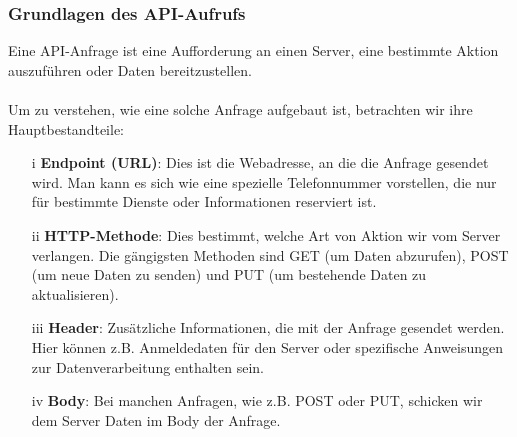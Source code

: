 \documentclass[12pt,a4paper]{article}
\begin{document}
\subsubsection{Grundlagen des API-Aufrufs}
Eine API-Anfrage ist eine Aufforderung an einen Server, eine bestimmte Aktion auszuführen oder Daten bereitzustellen. 
\\ \\
Um zu verstehen, wie eine solche Anfrage aufgebaut ist, betrachten wir ihre Hauptbestandteile:
\begin{enumerate}
	\item[i] \textbf{Endpoint (URL)}: Dies ist die Webadresse, an die die Anfrage gesendet wird. Man kann es sich wie eine spezielle Telefonnummer vorstellen, die nur für bestimmte Dienste oder Informationen reserviert ist.
	\item[ii] \textbf{HTTP-Methode}: Dies bestimmt, welche Art von Aktion wir vom Server verlangen. Die gängigsten Methoden sind GET (um Daten abzurufen), POST (um neue Daten zu senden) und PUT (um bestehende Daten zu aktualisieren).
	\item[iii]  \textbf{Header}: Zusätzliche Informationen, die mit der Anfrage gesendet werden. Hier können z.B. Anmeldedaten für den Server oder spezifische Anweisungen zur Datenverarbeitung enthalten sein.
	\item[iv]  \textbf{Body}: Bei manchen Anfragen, wie z.B. POST oder PUT, schicken wir dem Server Daten im Body der Anfrage.
\end{enumerate}
\end{document}
